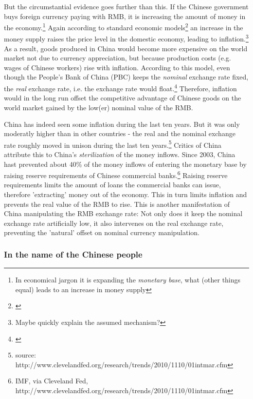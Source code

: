 But the circumstantial evidence goes further than this. If the Chinese government buys foreign currency paying with RMB, it is increasing the amount of money in the economy.\footnote{In economical jargon it is expanding the \emph{monetary base}, what (other things equal) leads to an increase in money supply} Again according to standard economic models\footnote{\cite[pp. ?]{Krugman2008}} an increase in the money supply raises the price level in the domestic economy, leading to inflation.\footnote{Maybe quickly explain the assumed mechanism?} As a result, goods produced in China would become more expensive on the world market not due to currency appreciation, but because production costs (e.g. wages of Chinese workers) rise with inflation. According to this model, even though the People's Bank of China (PBC) keeps the \emph{nominal} exchange rate fixed, the \emph{real} exchange rate, i.e. the exchange rate would float.\footnote{\cite[p. 509]{Krugman}} Therefore, inflation would in the long run offset the competitive advantage of Chinese goods on the world market gained by the low(er) nominal value of the RMB.


China has indeed seen some inflation during the last ten years. But it was only moderatly higher than in other countries - the real and the nominal exchange rate roughly moved in unison during the last ten years.\footnote{source: http://www.clevelandfed.org/research/trends/2010/1110/01intmar.cfm}%
Critics of China attribute this to China's \emph{sterilization} of the money inflows. Since 2003, China hast prevented about 40\% of the money inflows of entering the monetary base by raising reserve requirements of Chinese commercial banks.\footnote{IMF, via Cleveland Fed, http://www.clevelandfed.org/research/trends/2010/1110/01intmar.cfm}%
Raising reserve requirements limits the amount of loans the commercial banks can issue, therefore 'extracting' money out of the economy. This in turn limits inflation and prevents the real value of the RMB to rise. This is another manifestation of China manipulating the RMB exchange rate: Not only does it keep the nominal exchange rate artificially low, it also intervenes on the real exchange rate, preventing the 'natural' offset on nominal currency manipulation.

\subsubsection{In the name of the Chinese people}


